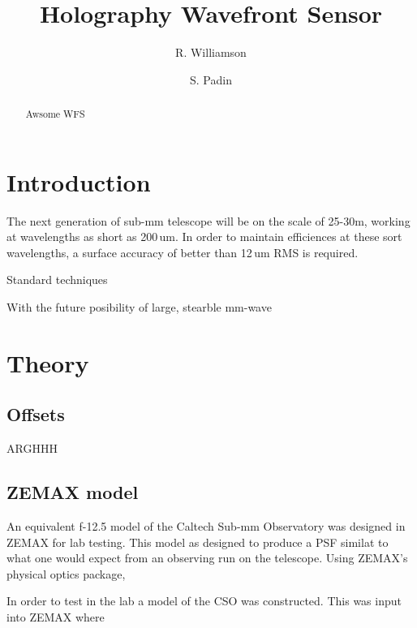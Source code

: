 \documentclass[osajnl,twocolumn,showpacs,superscriptaddress,11pt]{revtex4-1} %
\begin{document}
\title{Holography Wavefront Sensor}

\author{R. Williamson}
\author{S. Padin}


\begin{abstract} Awsome WFS
\end{abstract}


\maketitle %

\section{Introduction}

The next generation of sub-mm telescope will be on the scale of 25-30m, working at wavelengths as short as 200\,um.  In order to maintain efficiences at these sort wavelengths, a surface accuracy of better than 12\,um RMS is required. 

Standard techniques  

With the future posibility of large, stearble mm-wave 

\section{Theory}

\subsection{Offsets}

ARGHHH

\subsection{ZEMAX model}

An equivalent f-12.5 model of the Caltech Sub-mm Observatory was designed in ZEMAX for lab testing.  This model as designed to produce a PSF similat to what one would expect from an observing run on the telescope.  Using ZEMAX's physical optics package, 

In order to test in the lab a model of the CSO was constructed. This was input into ZEMAX where 
\end{document}
